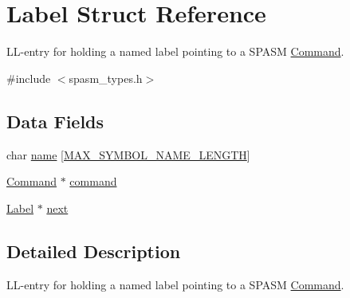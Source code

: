 \hypertarget{struct_label}{\section{\-Label \-Struct \-Reference}
\label{struct_label}
}


\-L\-L-\/entry for holding a named label pointing to a \-S\-P\-A\-S\-M \hyperlink{struct_command}{\-Command}.  




{\ttfamily \#include $<$spasm\-\_\-types.\-h$>$}

\subsection*{\-Data \-Fields}
\begin{DoxyCompactItemize}
\item 
char \hyperlink{struct_label_a96e0274a8d36db81d857e9536c8d94e5}{name} \mbox{[}\hyperlink{spasm__types_8h_a0a00b7461a4fb4e2a8a38858aacb4303}{\-M\-A\-X\-\_\-\-S\-Y\-M\-B\-O\-L\-\_\-\-N\-A\-M\-E\-\_\-\-L\-E\-N\-G\-T\-H}\mbox{]}
\item 
\hyperlink{struct_command}{\-Command} $\ast$ \hyperlink{struct_label_aeaf8698a75695ec399c3ce02c7804fae}{command}
\item 
\hyperlink{struct_label}{\-Label} $\ast$ \hyperlink{struct_label_aba70a946336559c889fe6a5a3e43f785}{next}
\end{DoxyCompactItemize}


\subsection{\-Detailed \-Description}
\-L\-L-\/entry for holding a named label pointing to a \-S\-P\-A\-S\-M \hyperlink{struct_command}{\-Command}. 

